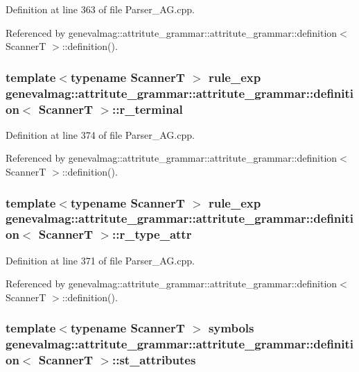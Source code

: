Definition at line 363 of file Parser\_\-AG.cpp.

Referenced by genevalmag::attritute\_\-grammar::attritute\_\-grammar::definition$<$ ScannerT $>$::definition().\hypertarget{structgenevalmag_1_1attritute__grammar_1_1definition_e3ae426438632f371a7ead6c83dee556}{
\subsubsection[{r\_\-terminal}]{\setlength{\rightskip}{0pt plus 5cm}template$<$typename ScannerT $>$ {\bf rule\_\-exp} genevalmag::attritute\_\-grammar::attritute\_\-grammar::definition$<$ ScannerT $>$::{\bf r\_\-terminal}}}
\label{structgenevalmag_1_1attritute__grammar_1_1definition_e3ae426438632f371a7ead6c83dee556}




Definition at line 374 of file Parser\_\-AG.cpp.

Referenced by genevalmag::attritute\_\-grammar::attritute\_\-grammar::definition$<$ ScannerT $>$::definition().\hypertarget{structgenevalmag_1_1attritute__grammar_1_1definition_3771729fe784b22ce9c81172be22275b}{
\subsubsection[{r\_\-type\_\-attr}]{\setlength{\rightskip}{0pt plus 5cm}template$<$typename ScannerT $>$ {\bf rule\_\-exp} genevalmag::attritute\_\-grammar::attritute\_\-grammar::definition$<$ ScannerT $>$::{\bf r\_\-type\_\-attr}}}
\label{structgenevalmag_1_1attritute__grammar_1_1definition_3771729fe784b22ce9c81172be22275b}




Definition at line 371 of file Parser\_\-AG.cpp.

Referenced by genevalmag::attritute\_\-grammar::attritute\_\-grammar::definition$<$ ScannerT $>$::definition().\hypertarget{structgenevalmag_1_1attritute__grammar_1_1definition_145890fee0469444e83bfadc8524b984}{
\subsubsection[{st\_\-attributes}]{\setlength{\rightskip}{0pt plus 5cm}template$<$typename ScannerT $>$ symbols genevalmag::attritute\_\-grammar::attritute\_\-grammar::definition$<$ ScannerT $>$::{\bf st\_\-attributes}}}
\label{structgenevalmag_1_1attritute__grammar_1_1definition_145890fee0469444e83bfadc8524b984}




